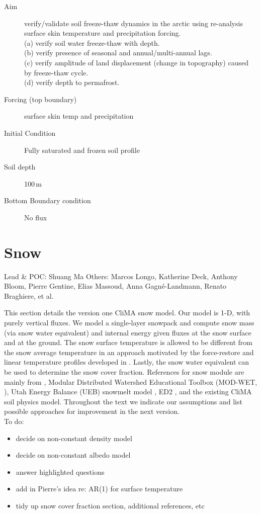 \documentclass[twoside,10pt]{report}
\begin{document}
\begin{description}
\item [Aim] verify/validate soil freeze-thaw dynamics in the arctic using re-analysis surface skin temperature and precipitation forcing. \\
(a) verify soil water freeze-thaw with depth. \\
(b) verify presence of seasonal and annual/multi-annual lags. \\
(c) verify amplitude of land displacement (change in topography) caused by freeze-thaw cycle. \\
(d) verify depth to permafrost.
\item [Forcing (top boundary)] surface skin temp and precipitation
\item [Initial Condition] Fully saturated and frozen soil profile
\item [Soil depth] 100\,m
\item [Bottom Boundary condition] No flux
\end{description}

\chapter{Snow}
Lead \& POC: Shuang Ma
Others: Marcos Longo, Katherine Deck, Anthony Bloom, Pierre Gentine, Elias Massoud, Anna Gagné-Landmann, Renato Braghiere, et al.

This section details the version one CliMA snow model. Our model is 1-D, with purely vertical fluxes. We model a single-layer snowpack and compute snow mass (via snow water equivalent) and internal energy given fluxes at the snow surface and at the ground. The snow surface temperature is allowed to be different from the snow average temperature in an approach motivated by the force-restore and linear temperature profiles developed in \citet{Semtner76a, You2014}. Lastly, the snow water equivalent can be used to determine the snow cover fraction. References for snow module are mainly from \citet{Bonan19a}, Modular Distributed Watershed Educational Toolbox (MOD-WET, \citet{Margulis}),  Utah Energy Balance (UEB) snowmelt model \citep{TarbotonLuce, You2014}, ED2 \citep{Walko00a,Longo19a}, and the existing CliMA soil physics model. Throughout the text we indicate our assumptions and list possible approaches for improvement in the next version.\\

To do:
\begin{itemize}
    \item decide on non-constant density model
    \item decide on non-constant albedo model
    \item answer highlighted questions
    \item add in Pierre's idea re: AR(1) for surface temperature
    \item tidy up snow cover fraction section, additional references, etc
\end{itemize}
\end{document}

